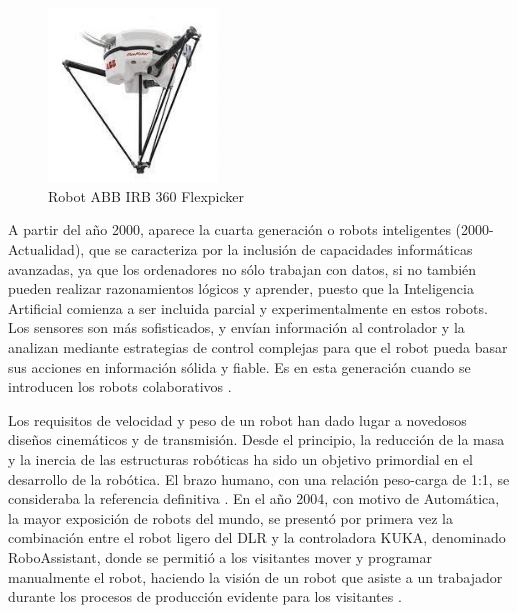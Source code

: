   \begin{figure} [H]
    \begin{center}
      \includegraphics[width=45mm]{figs/flexpicker_ABB.jpeg}
    \end{center}
    \caption{Robot ABB IRB 360 Flexpicker}
    \label{fig:Flexpicker_ABB}
  \end{figure}
  
A partir del año 2000, aparece la cuarta generación o robots inteligentes (2000-Actualidad), que se caracteriza por la inclusión de capacidades informáticas avanzadas, ya que los ordenadores no sólo trabajan con datos, si no también pueden realizar razonamientos lógicos y aprender, puesto que la Inteligencia Artificial comienza a ser incluida parcial y experimentalmente en estos robots. Los sensores son más sofisticados, y envían información al controlador y la analizan mediante estrategias de control complejas para que el robot pueda basar sus acciones en información sólida y fiable. Es en esta generación cuando se introducen los robots colaborativos \cite{Zamalloa17}.\\
\pagebreak
  
Los requisitos de velocidad y peso de un robot han dado lugar a novedosos diseños cinemáticos y de transmisión. Desde el principio, la reducción de la masa y la inercia de las estructuras robóticas ha sido un objetivo primordial en el desarrollo de la robótica. El brazo humano, con una relación peso-carga de 1:1, se consideraba la referencia definitiva \cite{Siciliano16}. %
En el año 2004, con motivo de Automática, la mayor exposición de robots del mundo, se presentó por primera vez la combinación entre el robot ligero del DLR y la controladora KUKA, denominado RoboAssistant, donde se permitió a los visitantes mover y programar manualmente el robot, haciendo la visión de un robot que asiste a un trabajador durante los procesos de producción evidente para los visitantes \cite{Bischoff10}. \\
  

